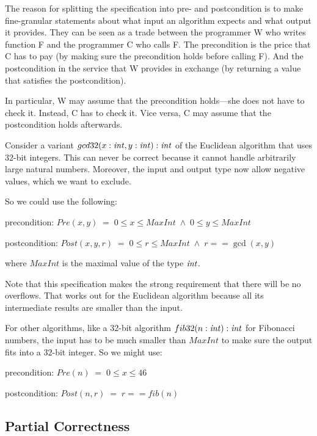 The reason for splitting the specification into pre- and postcondition is to make fine-granular statements about what input an algorithm expects and what output it provides.
They can be seen as a trade between the programmer W who writes function F and the programmer C who calls F.
The precondition is the price that C has to pay (by making sure the precondition holds before calling F).
And the postcondition in the service that W provides in exchange (by returning a value that satisfies the postcondition).

In particular, W may assume that the precondition holds---she does not have to check it.
Instead, C has to check it.
Vice versa, C may assume that the postcondition holds afterwards.

\begin{example}
Consider a variant $gcd32(x:\mathit{int},y:\mathit{int}):\mathit{int}$ of the Euclidean algorithm that uses $32$-bit integers.
This can never be correct because it cannot handle arbitrarily large natural numbers.
Moreover, the input and output type now allow negative values, which we want to exclude.
 
So we could use the following:
\begin{compactitem}
\item precondition: $Pre(x,y)\;=\;0\leq x \leq MaxInt \;\wedge\; 0\leq y \leq MaxInt$
\item postcondition: $Post(x,y,r)\;=\;0\leq r\leq MaxInt\;\wedge\; r==\gcd(x,y)$
\end{compactitem}
where $MaxInt$ is the maximal value of the type $\mathit{int}$.

Note that this specification makes the strong requirement that there will be no overflows.
That works out for the Euclidean algorithm because all its intermediate results are smaller than the input.

For other algorithms, like a 32-bit algorithm $fib32(n:\mathit{int}):\mathit{int}$ for Fibonacci numbers, the input has to be much smaller than $MaxInt$ to make sure the output fits into a $32$-bit integer.
So we might use:
\begin{compactitem}
\item precondition: $Pre(n)\;=\;0\leq x \leq 46$
\item postcondition: $Post(n,r)\;=\;r==fib(n)$
\end{compactitem}
\end{example}

\subsection{Partial Correctness}\label{sec:ad:loopinv}

